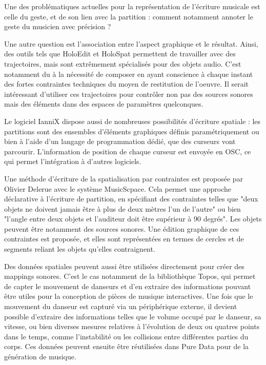 \documentclass[french,12pt]{article}
\begin{document}
Une des problématiques actuelles pour la représentation de l'écriture musicale est celle du geste, et de son lien avec la partition : comment notamment annoter le geste du musicien avec précision ?

Une autre question est l'association entre l'aspect graphique et le résultat. Ainsi, des outils tels que HoloEdit et HoloSpat permettent de travailler avec des trajectoires, mais sont extrêmement spécialisés pour des objets audio. C'est notamment du à la nécessité de composer en ayant conscience à chaque instant des fortes contraintes techniques du moyen de restitution de l'oeuvre. Il serait intéressant d'utiliser ces trajectoires pour contrôler non pas des sources sonores mais des éléments dans des espaces de paramètres quelconques.

Le logiciel IanniX\cite{jacquemin_iannix_2012} dispose aussi de nombreuses possibilités d'écriture spatiale : les partitions sont des ensembles d'éléments graphiques définis paramétriquement ou bien à l'aide d'un langage de programmation dédié, que des curseurs vont parcourir. L'information de position de chaque curseur est envoyée en OSC, ce qui permet l'intégration à d'autres logiciels.

Une méthode d'écriture de la spatialisation par contraintes est proposée par Olivier Delerue avec le système MusicScpace\cite{delerue_spatialisation_2004}. Cela permet une approche déclarative à l'écriture de partition, en spécifiant des contraintes telles que "deux objets ne doivent jamais être à plus de deux mètres l'un de l'autre" ou bien "l'angle entre deux objets et l'auditeur doit être supérieur à 90 degrés". Les objets peuvent être notamment des sources sonores. Une édition graphique de ces contraintes est proposée, et elles sont représentées en termes de cercles et de segments reliant les objets qu'elles contraignent.

Des données spatiales peuvent aussi être utilisées directement pour créer des mappings sonores. C'est le cas notamment de la bibliothèque Topos\cite{naveda_topos_2014}, qui permet de capter le mouvement de danseurs et d'en extraire des informations pouvant être utiles pour la conception de pièces de musique interactives. Une fois que le mouvement du danseur est capturé via un périphérique externe, il devient possible d'extraire des informations telles que le volume occupé par le danseur, sa vitesse, ou bien diverses mesures relatives à l'évolution de deux ou quatres points dans le temps, comme l'instabilité ou les collisions entre différentes parties du corps. Ces données peuvent ensuite être réutilisées dans Pure Data pour de la génération de musique.
\end{document}
